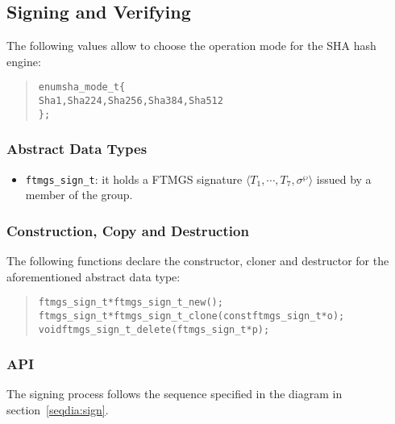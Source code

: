 \documentclass[a4paper]{article}
\newenvironment{code}%
{\begin{quote}\footnotesize\begin{alltt}}%
{\end{alltt}\end{quote}}%
\newcommand{\tuple}[1]{\ensuremath{\langle #1 \rangle}}
\begin{document}
\subsection{Signing and Verifying}

The following values allow to choose the operation mode for the SHA
hash engine:
\begin{code}
enum sha_mode_t \{
    Sha1, Sha224, Sha256, Sha384, Sha512
\};
\end{code}

\subsubsection*{Abstract Data Types}
\begin{itemize}\small
\item \verb|ftmgs_sign_t|: it holds a FTMGS signature
  \tuple{T_1,\cdots,T_7,\sigma^{\wp}} issued by a member of the group.
\end{itemize}
\subsubsection*{Construction, Copy and Destruction}
The following functions declare the constructor, cloner and destructor
for the aforementioned abstract data type:
\begin{code}
ftmgs_sign_t* ftmgs_sign_t_new();
ftmgs_sign_t* ftmgs_sign_t_clone(const ftmgs_sign_t* o);
void ftmgs_sign_t_delete(ftmgs_sign_t* p);
\end{code}
\subsubsection*{API}
The signing process follows the sequence specified in the diagram in
section~\ref{seqdia:sign}.
\end{document}
